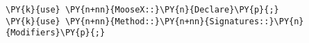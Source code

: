 \begin{Verbatim}[commandchars=\\\{\}]
\PY{k}{use} \PY{n+nn}{MooseX::}\PY{n}{Declare}\PY{p}{;}
\PY{k}{use} \PY{n+nn}{Method::}\PY{n+nn}{Signatures::}\PY{n}{Modifiers}\PY{p}{;}
\end{Verbatim}

